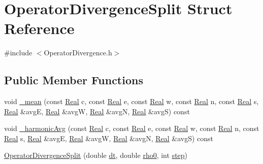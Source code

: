\hypertarget{struct_operator_divergence_split}{}\section{Operator\+Divergence\+Split Struct Reference}
\label{struct_operator_divergence_split}


{\ttfamily \#include $<$Operator\+Divergence.\+h$>$}

\subsection*{Public Member Functions}
\begin{DoxyCompactItemize}
\item 
void \hyperlink{struct_operator_divergence_split_aa0a9f4069d8ba018e22b0de07ac556d9}{\+\_\+mean} (const \hyperlink{_h_d_f5_dumper_8h_a445a5f0e2a34c9d97d69a3c2d1957907}{Real} c, const \hyperlink{_h_d_f5_dumper_8h_a445a5f0e2a34c9d97d69a3c2d1957907}{Real} e, const \hyperlink{_h_d_f5_dumper_8h_a445a5f0e2a34c9d97d69a3c2d1957907}{Real} w, const \hyperlink{_h_d_f5_dumper_8h_a445a5f0e2a34c9d97d69a3c2d1957907}{Real} n, const \hyperlink{_h_d_f5_dumper_8h_a445a5f0e2a34c9d97d69a3c2d1957907}{Real} s, \hyperlink{_h_d_f5_dumper_8h_a445a5f0e2a34c9d97d69a3c2d1957907}{Real} \&avg\+E, \hyperlink{_h_d_f5_dumper_8h_a445a5f0e2a34c9d97d69a3c2d1957907}{Real} \&avg\+W, \hyperlink{_h_d_f5_dumper_8h_a445a5f0e2a34c9d97d69a3c2d1957907}{Real} \&avg\+N, \hyperlink{_h_d_f5_dumper_8h_a445a5f0e2a34c9d97d69a3c2d1957907}{Real} \&avg\+S) const 
\item 
void \hyperlink{struct_operator_divergence_split_a9b4e37af183f7bd2ed76769b39c8810a}{\+\_\+harmonic\+Avg} (const \hyperlink{_h_d_f5_dumper_8h_a445a5f0e2a34c9d97d69a3c2d1957907}{Real} c, const \hyperlink{_h_d_f5_dumper_8h_a445a5f0e2a34c9d97d69a3c2d1957907}{Real} e, const \hyperlink{_h_d_f5_dumper_8h_a445a5f0e2a34c9d97d69a3c2d1957907}{Real} w, const \hyperlink{_h_d_f5_dumper_8h_a445a5f0e2a34c9d97d69a3c2d1957907}{Real} n, const \hyperlink{_h_d_f5_dumper_8h_a445a5f0e2a34c9d97d69a3c2d1957907}{Real} s, \hyperlink{_h_d_f5_dumper_8h_a445a5f0e2a34c9d97d69a3c2d1957907}{Real} \&avg\+E, \hyperlink{_h_d_f5_dumper_8h_a445a5f0e2a34c9d97d69a3c2d1957907}{Real} \&avg\+W, \hyperlink{_h_d_f5_dumper_8h_a445a5f0e2a34c9d97d69a3c2d1957907}{Real} \&avg\+N, \hyperlink{_h_d_f5_dumper_8h_a445a5f0e2a34c9d97d69a3c2d1957907}{Real} \&avg\+S) const 
\item 
\hyperlink{struct_operator_divergence_split_a1e587e11e410c9a9d12b591f94149c72}{Operator\+Divergence\+Split} (double \hyperlink{struct_operator_divergence_split_a9749e394edfddc02d599711bb6b727b1}{dt}, double \hyperlink{struct_operator_divergence_split_aa328435749c668cea1f697624d47c815}{rho0}, int \hyperlink{struct_operator_divergence_split_add46415c643d7ba724e43bbd13628669}{step})

\end{DoxyCompactItemize}
